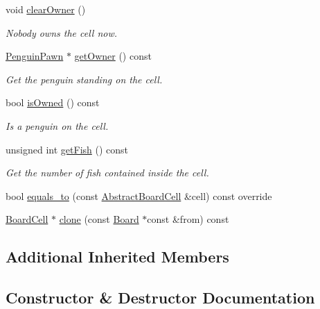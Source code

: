 \begin{DoxyCompactItemize}
void \hyperlink{classgame_1_1penguin_1_1_board_cell_a923c503caf2ed45b2fb0f49eb0cf3201}{clear\+Owner} ()
\begin{DoxyCompactList}\small\item\em Nobody owns the cell now. \end{DoxyCompactList}\item 
\hyperlink{classgame_1_1penguin_1_1_penguin_pawn}{Penguin\+Pawn} $\ast$ \hyperlink{classgame_1_1penguin_1_1_board_cell_a011487b961b356a891144edcccc1473f}{get\+Owner} () const
\begin{DoxyCompactList}\small\item\em Get the penguin standing on the cell. \end{DoxyCompactList}\item 
bool \hyperlink{classgame_1_1penguin_1_1_board_cell_a12cd55e333821bcecaa201dde758c1a1}{is\+Owned} () const
\begin{DoxyCompactList}\small\item\em Is a penguin on the cell. \end{DoxyCompactList}\item 
unsigned int \hyperlink{classgame_1_1penguin_1_1_board_cell_abe8f2dc0eef3aed1e8701dc0b021c5a6}{get\+Fish} () const
\begin{DoxyCompactList}\small\item\em Get the number of fish contained inside the cell. \end{DoxyCompactList}\item 
bool \hyperlink{classgame_1_1penguin_1_1_board_cell_a1ed5a3134f831bef111c6294c07388bf}{equals\+\_\+to} (const \hyperlink{classgame_1_1_abstract_board_cell}{Abstract\+Board\+Cell} \&cell) const override
\item 
\hyperlink{classgame_1_1penguin_1_1_board_cell}{Board\+Cell} $\ast$ \hyperlink{classgame_1_1penguin_1_1_board_cell_a4d3577488552bf0ba4822ac265532825}{clone} (const \hyperlink{classgame_1_1penguin_1_1_board}{Board} $\ast$const \&from) const
\end{DoxyCompactItemize}
\subsection*{Additional Inherited Members}


\subsection{Constructor \& Destructor Documentation}
\mbox{\label{classgame_1_1penguin_1_1_board_cell_a2c76e638f5d0d4374b422756b08cb61f}} 
